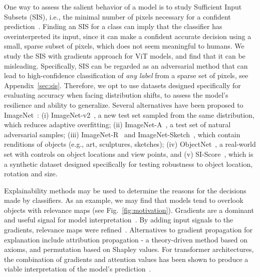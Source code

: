 \documentclass{article}
\begin{document}
One way to assess the salient behavior of a model is to study Sufficient Input Subsets (SIS), i.e., the minimal number of pixels necessary for a confident prediction~\cite{carter2019made,overinterpretation}. Finding an SIS for a class can imply that the classifier has overinterpreted its input, since it can make a confident accurate decision using a small, sparse subset of pixels, which does not seem meaningful to humans. We study the SIS with gradients approach for ViT models, and find that it can be misleading. Specifically, SIS can be regarded as an adversarial method that can lead to high-confidence classification of {\em any label} from a sparse set of pixels, see Appendix~\ref{sec:sis}. Therefore, we opt to use datasets designed specifically for evaluating accuracy when facing distribution shifts, to assess the model's resilience and ability to generalize. Several alternatives have been proposed to ImageNet~\cite{ILSVRC15}: (i) ImageNet-v2~\cite{recht2019imagenet}, a new test set sampled from the same distribution, which reduces adaptive overfitting; (ii) ImageNet-A~\cite{Hendrycks_2021_CVPR}, a test set of natural adversarial samples; (iii) ImageNet-R~\cite{Hendrycks_2021_ICCV} and ImageNet-Sketch~\cite{NEURIPS2019_3eefceb8}, which contain renditions of objects (e.g., art, sculptures, sketches); (iv) ObjectNet~\cite{barbu2019objectnet}, a real-world set with controls on object locations and view points, and (v) SI-Score~\cite{Djolonga2021OnRA}, which is a synthetic dataset designed specifically for testing robustness to object location, rotation and size. 

Explainability methods may be used to determine the reasons for the decisions made by classifiers. As an example, we may find that models tend to overlook objects with relevance maps (see Fig.~\ref{fig:motivation}). Gradients are a dominant and useful signal for model interpretation~\cite{simonyan2014deep, dabkowski2017real, mahendran2016visualizing}. By adding input signals to the gradients, relevance maps were refined~\cite{gu2018recent, shrikumar2017learning, smilkov2017smoothgrad, srinivas2019full}. Alternatives to gradient propagation for explanation include attribution propagation - a theory-driven method based on axioms, and permutation based on Shapley values\cite{bach2015pixel, montavon2017explaining, shrikumar2017learning, lundberg2017unified}. For transformer architectures, the combination of gradients and attention values has been shown to produce a viable interpretation of the model's prediction~\cite{Chefer_2021_ICCV, chefer2020transformer}.
\end{document}
